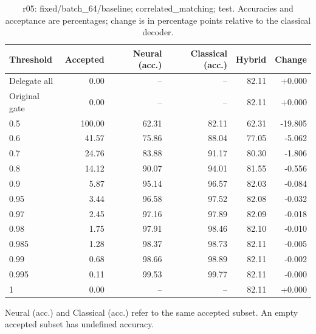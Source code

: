 \begin{table}[htbp]
\centering\small
\setlength{\tabcolsep}{3pt}
\caption{r05: fixed/batch\_64/baseline; correlated\_matching; test. Accuracies and acceptance are percentages; change is in percentage points relative to the classical decoder.}
\begin{tabular}{lrrrrr}
\toprule
Threshold & Accepted & Neural (acc.) & Classical (acc.) & Hybrid & Change \\
\midrule
Delegate all & 0.00 & -- & -- & 82.11 & +0.000 \\
Original gate & 0.00 & -- & -- & 82.11 & +0.000 \\
0.5 & 100.00 & 62.31 & 82.11 & 62.31 & -19.805 \\
0.6 & 41.57 & 75.86 & 88.04 & 77.05 & -5.062 \\
0.7 & 24.76 & 83.88 & 91.17 & 80.30 & -1.806 \\
0.8 & 14.12 & 90.07 & 94.01 & 81.55 & -0.556 \\
0.9 & 5.87 & 95.14 & 96.57 & 82.03 & -0.084 \\
0.95 & 3.44 & 96.58 & 97.52 & 82.08 & -0.032 \\
0.97 & 2.45 & 97.16 & 97.89 & 82.09 & -0.018 \\
0.98 & 1.75 & 97.91 & 98.46 & 82.10 & -0.010 \\
0.985 & 1.28 & 98.37 & 98.73 & 82.11 & -0.005 \\
0.99 & 0.68 & 98.66 & 98.89 & 82.11 & -0.002 \\
0.995 & 0.11 & 99.53 & 99.77 & 82.11 & -0.000 \\
1 & 0.00 & -- & -- & 82.11 & +0.000 \\
\bottomrule
\end{tabular}
\par\smallskip\footnotesize Neural (acc.) and Classical (acc.) refer to the same accepted subset. An empty accepted subset has undefined accuracy.
\end{table}
